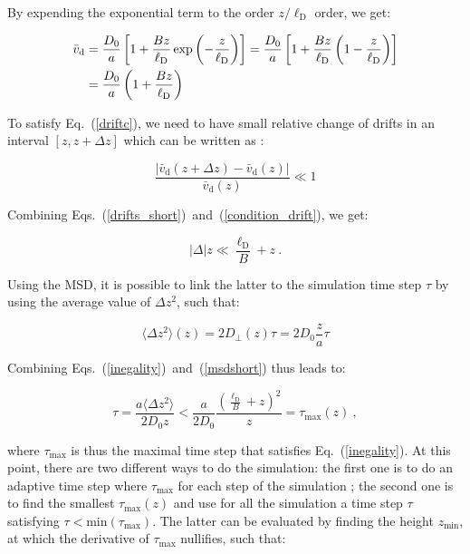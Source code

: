 By expending the exponential term to the order $z/\ell_\mathrm{D}$ order, we get:

\begin{equation}
	\begin{aligned}
		\bar{v}_\textnormal{d} &= \frac{D_0}{a} \left[ 1 + \frac{Bz}{\ell_\mathrm{D}} \exp \left(-\frac{z}{\ell_\mathrm{D}}\right)\right]
		=  \frac{D_0}{a} \left[ 1 + \frac{Bz}{\ell_\mathrm{D}}  \left(1 -\frac{z}{\ell_\mathrm{D}}\right)\right] \\
		& = \frac{D_0}{a} \left( 1 + \frac{B z}{\ell_\mathrm{D}}\right)
	\end{aligned}
	\label{drifts_short}
\end{equation}

To satisfy Eq.~(\ref{driftc}), we need to have small relative change of drifts in an interval $[z, z+\Delta z]$ which can be written as \cite{matse_state-dependent_nodate}:

\begin{equation}
	\frac{|\bar{v}_\mathrm{d} (z + \Delta z) - \bar{v}_\mathrm{d} (z)|}{\bar{v}_\mathrm{d} (z)} \ll 1
	\label{condition_drift}
\end{equation}

Combining Eqs.~(\ref{drifts_short})~and~(\ref{condition_drift}), we get:

\begin{equation}
	|\Delta| z \ll \frac{\ell_\mathrm{D}}{B} + z ~.
	\label{inegality}
\end{equation}


Using the \gls{MSD}, it is possible to link the latter to the simulation time step $\tau$ by using the average value of $\Delta z ^2 $, such that:

\begin{equation}
	\langle \Delta z ^2 \rangle (z) = 2 D_\bot (z) \tau = 2D_0 \frac{z}{a}\tau 
	\label{msdshort}
\end{equation}

Combining Eqs.~(\ref{inegality})~and~(\ref{msdshort}) thus leads to:

\begin{equation}
	\tau = \frac{a\langle \Delta z ^2 \rangle }{2 D_0 z} < \frac{a}{2 D_0 } \frac{(\frac{\ell_\mathrm{D}}{B} + z) ^2}{z} = \tau_\mathrm{max} (z)~,
	\label{taumax}
\end{equation}

where $ \tau_\mathrm{max}$ is thus the maximal time step that satisfies Eq.~(\ref{inegality}). At this point, there are two different ways to do the simulation: the first one is to do an adaptive time step where $\tau_\mathrm{max}$ for each step of the simulation ; the second one is to find the smallest $\tau_\mathrm{max}(z)$ and use for all the simulation a time step $\tau$ satisfying $\tau < \mathrm{min}(\tau_\mathrm{max}) $. The latter can be evaluated by finding the height $z_\mathrm{min}$, at which the derivative of $ \tau_\mathrm{max}$ nullifies, such that:


